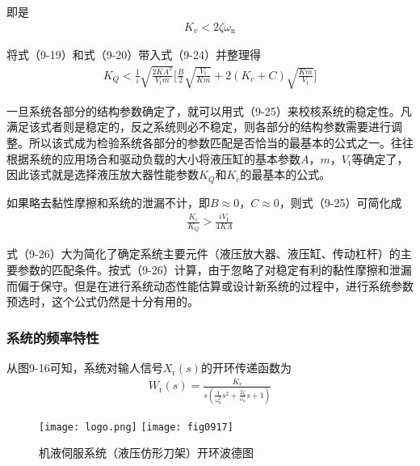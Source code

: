 \noindent 即是
\begin{align}
    K_{v}<2\zeta \omega_{\text{n}}
\end{align}

\noindent 将式（9-19）和式（9-20）带入式（9-24）并整理得
\begin{align}
    K_{Q}<\frac{1}{i}\sqrt{\frac{2KA^2}{V_{\text{t}}m}}\Bigg[\frac{B}{2}\sqrt{\frac{V_{\text{t}}}{Km}}+2(K_{c}+C)\sqrt{\frac{Km}{V_{\text{t}}}}\Bigg]
\end{align}

一旦系统各部分的结构参数确定了，就可以用式（9-25）来校核系统的稳定性。凡满足该式者则是稳定的，反之系统则必不稳定，则各部分的结构参数需要进行调整。所以该式成为检验系统各部分的参数匹配是否恰当的最基本的公式之一。往往根据系统的应用场合和驱动负载的大小将液压缸的基本参数$A$，$m$，$V_{\text{t}}$等确定了，因此该式就是选择液压放大器性能参数$K_{Q}$和$K_{c}$的最基本的公式。

如果略去黏性摩擦和系统的泄漏不计，即$B\approx 0$，$C\approx 0$，则式（9-25）可简化成
\begin{align}
    \frac{K_{c}}{K_{Q}}>\frac{iV_{\text{t}}}{4KA}
\end{align}

式（9-26）大为简化了确定系统主要元件（液压放大器、液压缸、传动杠杆）的主要参数的匹配条件。按式（9-26）计算，由于忽略了对稳定有利的黏性摩擦和泄漏而偏于保守。但是在进行系统动态性能估算或设计新系统的过程中，进行系统参数预选时，这个公式仍然是十分有用的。

\subsubsection{系统的频率特性}

从图9-16可知，系统对输人信号$X_{\text{r}}(s)$的开环传递函数为
\begin{align}
    W_{\text{r}}(s)=\frac{K_{v}}{s(\frac{1}{\omega_{\text{n}}^2}s^2+\frac{2\zeta }{\omega_{\text{n}}}s+1)}
\end{align}

\begin{figure}[!hbt]
    \centering
    \ifOpenSource
    \texttt{[image: logo.png]}
    \else
    \texttt{[image: fig0917]}
    \fi
    \caption{机液伺服系统（液压仿形刀架）开环波德图}
    \label{fig:fig0917}
\end{figure}

